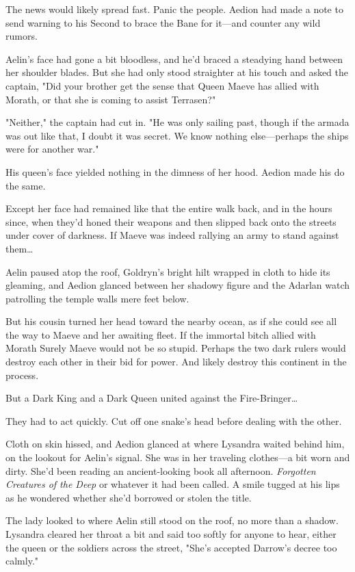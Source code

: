 The news would likely spread fast. Panic the people. Aedion had made a note to send warning to his Second to brace the Bane for it---and counter any wild rumors.

Aelin's face had gone a bit bloodless, and he'd braced a steadying hand between her shoulder blades. But she had only stood straighter at his touch and asked the captain, "Did your brother get the sense that Queen Maeve has allied with Morath, or that she is coming to assist Terrasen?"

"Neither," the captain had cut in. "He was only sailing past, though if the armada was out like that, I doubt it was secret. We know nothing else---perhaps the ships were for another war."

His queen's face yielded nothing in the dimness of her hood. Aedion made his do the same.

Except her face had remained like that the entire walk back, and in the hours since, when they'd honed their weapons and then slipped back onto the streets under cover of darkness. If Maeve was indeed rallying an army to stand against them\ldots{}

Aelin paused atop the roof, Goldryn's bright hilt wrapped in cloth to hide its gleaming, and Aedion glanced between her shadowy figure and the Adarlan watch patrolling the temple walls mere feet below.

But his cousin turned her head toward the nearby ocean, as if she could see all the way to Maeve and her awaiting fleet. If the immortal bitch allied with Morath  Surely Maeve would not be so stupid. Perhaps the two dark rulers would destroy each other in their bid for power. And likely destroy this continent in the process.

But a Dark King and a Dark Queen united against the Fire-Bringer\ldots{}

They had to act quickly. Cut off one snake's head before dealing with the other.

Cloth on skin hissed, and Aedion glanced at where Lysandra waited behind him, on the lookout for Aelin's signal. She was in her traveling clothes---a bit worn and dirty. She'd been reading an ancient-looking book all afternoon. \emph{Forgotten Creatures of the Deep} or whatever it had been called. A smile tugged at his lips as he wondered whether she'd borrowed or stolen the title.

The lady looked to where Aelin still stood on the roof, no more than a shadow. Lysandra cleared her throat a bit and said too softly for anyone to hear, either the queen or the soldiers across the street, "She's accepted Darrow's decree too calmly."


